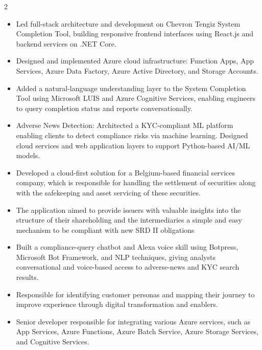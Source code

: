\documentclass[10pt,a4paper,ragged2e,withhyper]{altacv}
\begin{document}
\begin{paracol}{2}
\divider

\begin{itemize}
\item Led full-stack architecture and development on Chevron Tengiz System Completion Tool, building responsive frontend interfaces using React.js and backend services on .NET Core.
\item Designed and implemented Azure cloud infrastructure: Function Apps, App Services, Azure Data Factory, Azure Active Directory, and Storage Accounts.
\ifshowai
\item Added a natural-language understanding layer to the System Completion Tool using Microsoft LUIS and Azure Cognitive Services, enabling engineers to query completion status and reports conversationally.
\fi

\end{itemize}

\divider

\begin{itemize}
\item Adverse News Detection: Architected a KYC-compliant ML platform enabling clients to detect compliance risks via machine learning. Designed cloud services and web application layers to support Python-based AI/ML models.
\item Developed a cloud-first solution for a Belgium-based financial services company, which is responsible for handling the settlement of securities along with the safekeeping and asset servicing of these securities.
\item The application aimed to provide issuers with valuable insights into the structure of their shareholding and the intermediaries a simple and easy mechanism to be compliant with new SRD II obligations
\ifshowai
\item Built a compliance-query chatbot and Alexa voice skill using Botpress, Microsoft Bot Framework, and NLP techniques, giving analysts conversational and voice-based access to adverse-news and KYC search results.
\fi

\end{itemize}

\divider

\begin{itemize}
\item Responsible for identifying customer personas and mapping their journey to improve experience through digital transformation and enablers.
\item Senior developer responsible for integrating various Azure services, such as App Services, Azure Functions, Azure Batch Service, Azure Storage Services, and Cognitive Services.


\end{itemize}
\end{paracol}
\end{document}
